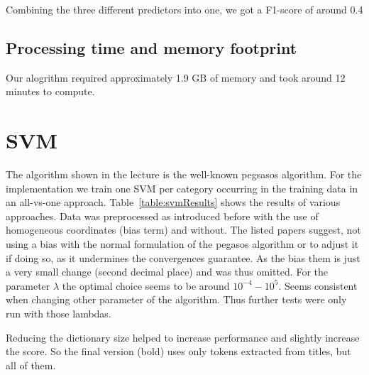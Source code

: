 \documentclass{article}
\begin{document}
            Combining the three different predictors into one, we got a F1-score of around 0.4

    \subsection{Processing time and memory footprint}
        Our alogrithm required approximately 1.9 GB of memory and took around 12 minutes to compute.

\section*{SVM}
The algorithm shown in the lecture is the well-known pegsasos algorithm\cite{shalev-shwartz_pegasos:_2011,shalev-shwartz_pegasos:_????}. For the implementation we train one SVM per category occurring in the training data in an all-vs-one approach.
Table~\ref{table:svmResults} shows the results of various approaches.
Data was preprocessed as introduced before with the use of homogeneous coordinates (bias term) and without. The listed papers suggest, not using a bias with the normal formulation of the pegasos algorithm or to adjust it if doing so, as it undermines the convergences guarantee. As the bias them is just a very small change (second decimal place) and was thus omitted. For the parameter $\lambda$ the optimal choice seems to be around $10^{-4} - 10^{5}$. Seems consistent when changing other parameter of the algorithm. Thus further tests were only run with those lambdas.

Reducing the dictionary size helped to increase performance and slightly increase the score. So the final version (bold) uses only tokens extracted from titles, but all of them.
\end{document}
